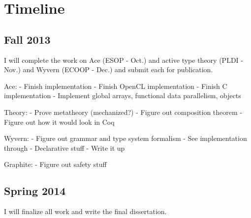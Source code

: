 \section{Timeline}

\subsection{Fall 2013}
I will complete the work on Ace (ESOP - Oct.) and active type theory (PLDI - Nov.) and Wyvern (ECOOP - Dec.) and submit each for publication.

Ace:
- Finish implementation
- Finish OpenCL implementation
- Finish C implementation
- Implement global arrays, functional data parallelism, objects

Theory:
- Prove metatheory (mechanized?)
- Figure out composition theorem
- Figure out how it would look in Coq

Wyvern:
- Figure out grammar and type system formalism
- See implementation through
- Declarative stuff
- Write it up

Graphite:
- Figure out safety stuff

\subsection{Spring 2014}
I will finalize all work and write the final dissertation.

